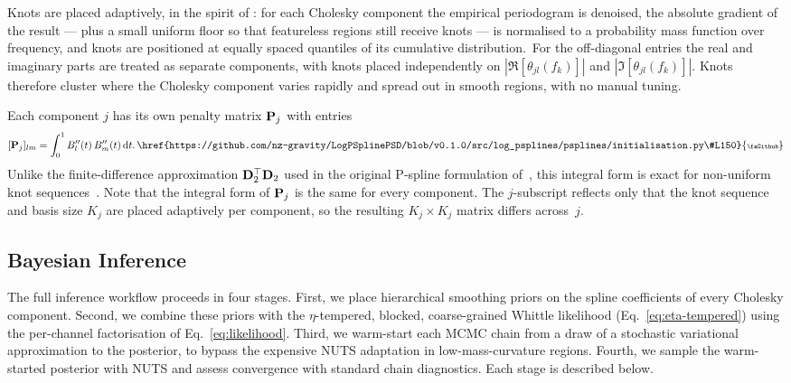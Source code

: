 \documentclass[%
	reprint,
	nofootinbib,
	amsmath,
	amssymb,
	aps,
]{revtex4-2}
\DeclareRobustCommand{\codelink}[1]{\,\href{#1}{\mbox{\scalebox{0.65}{\faGithub}}}}
\begin{document}
	Knots are placed adaptively, in the spirit of
	\citet{maturana-russel_bayesian_2021}: for each Cholesky component the
	empirical periodogram is denoised, the absolute gradient of the result
	--- plus a small uniform floor so that featureless regions still
	receive knots --- is normalised to a probability mass function over
	frequency, and knots are positioned at equally spaced quantiles of its
	cumulative
	distribution.\codelink{https://github.com/nz-gravity/LogPSplinePSD/blob/v0.1.0/src/log_psplines/psplines/knots_locator/knot_locator.py\#L217}
	For the off-diagonal entries the real and imaginary parts are treated as
	separate components, with knots placed independently on
	$|\Re[\theta_{jl}(f_{k})]|$ and $|\Im[\theta_{jl}(f_{k})]|$. Knots therefore cluster where the Cholesky component
	varies rapidly and spread out in smooth regions, with no manual tuning.

	Each component $j$ has its own penalty matrix $\bold{P}_{j}$ with
	entries
	\begin{equation}
		\label{eq:Pj}
		[\bold{P}_{j}]_{lm}= \int_{0}^{1} B_{l}''(t)\, B_{m}''(t)\, \mathrm{d}t.
		\codelink{https://github.com/nz-gravity/LogPSplinePSD/blob/v0.1.0/src/log_psplines/psplines/initialisation.py\#L150}
	\end{equation}
	Unlike the finite-difference approximation
	$\bold{D}_{2}^{\top}\bold{D}_{2}$ used in the original P-spline
	formulation of~\citet{EilersMarx1996}, this integral form is exact for
	non-uniform knot sequences~\citep{Wand2008}. 
	Note that the integral
	form of $\bold{P}_{j}$ is the same for every component. 
	The $j$-subscript reflects only that the knot sequence and basis size
	$K_{j}$ are placed adaptively per component, so the resulting $K_{j}\times K_{j}$ matrix differs
	across~$j$.

	\subsection{Bayesian Inference}
	\label{sec:bayesian-inference}
	The full inference workflow proceeds in four stages. First, we place
	hierarchical smoothing priors on the spline coefficients of every
	Cholesky component. Second, we combine these priors with the
	$\eta$-tempered, blocked, coarse-grained Whittle likelihood
	(Eq.~\ref{eq:eta-tempered}) using the per-channel factorisation of
	Eq.~\eqref{eq:likelihood}. Third, we warm-start each MCMC chain from
	a draw of a stochastic variational approximation to the posterior, to
	bypass the expensive NUTS adaptation in low-mass-curvature regions.
	Fourth, we sample the warm-started posterior with NUTS and assess
	convergence with standard chain diagnostics. Each stage is
	described below.
\end{document}
